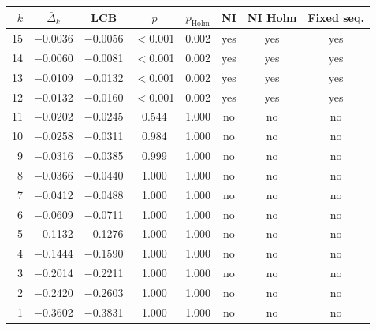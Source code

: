 \begin{table}[t]
\centering
\small
\caption{}
\label{tab:h1_holm}
\begin{tabular}{rccccccc}
\toprule
$k$ & $\bar\Delta_k$ & LCB & $p$ & $p_{\mathrm{Holm}}$ & NI & NI Holm & Fixed seq. \\
\midrule
15 & $-$0.0036 & $-$0.0056 & $<$0.001 & 0.002 & yes & yes & yes \\
14 & $-$0.0060 & $-$0.0081 & $<$0.001 & 0.002 & yes & yes & yes \\
13 & $-$0.0109 & $-$0.0132 & $<$0.001 & 0.002 & yes & yes & yes \\
12 & $-$0.0132 & $-$0.0160 & $<$0.001 & 0.002 & yes & yes & yes \\
11 & $-$0.0202 & $-$0.0245 & 0.544 & 1.000 & no & no & no \\
10 & $-$0.0258 & $-$0.0311 & 0.984 & 1.000 & no & no & no \\
9 & $-$0.0316 & $-$0.0385 & 0.999 & 1.000 & no & no & no \\
8 & $-$0.0366 & $-$0.0440 & 1.000 & 1.000 & no & no & no \\
7 & $-$0.0412 & $-$0.0488 & 1.000 & 1.000 & no & no & no \\
6 & $-$0.0609 & $-$0.0711 & 1.000 & 1.000 & no & no & no \\
5 & $-$0.1132 & $-$0.1276 & 1.000 & 1.000 & no & no & no \\
4 & $-$0.1444 & $-$0.1590 & 1.000 & 1.000 & no & no & no \\
3 & $-$0.2014 & $-$0.2211 & 1.000 & 1.000 & no & no & no \\
2 & $-$0.2420 & $-$0.2603 & 1.000 & 1.000 & no & no & no \\
1 & $-$0.3602 & $-$0.3831 & 1.000 & 1.000 & no & no & no \\
\bottomrule
\end{tabular}
\par\smallskip\parbox{0.95\linewidth}{\footnotesize {}}
\end{table}
